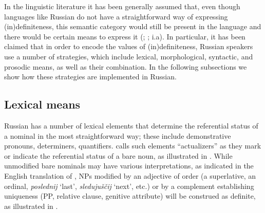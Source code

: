 \documentclass[output=paper,
colorlinks,
citecolor=brown,
newtxmath
]{langscibook}
\begin{document}
In the linguistic literature it has been generally assumed that, even though languages like Russian do not have a straightforward way of expressing (in)defi\-nite\-ness, this semantic category would still be present in the language and there would be certain means to express it (\citealt{GalkinaFedoruk1963}; \citealt{Pospelov1970}; i.a). %
In particular, it has been claimed
that in order to encode the values of (in)defi\-nite\-ness, Russian speakers use a number of strategies, which include lexical, %
morphological, syntactic, and prosodic means, as well as %
their combination. In the following subsections we show how these strategies are implemented in Russian.

\subsection{Lexical means}
Russian has a number of lexical elements that determine the referential status of a nominal in the most straightforward way; these include demonstrative pronouns, determiners, quantifiers. \citet{Paduceva1985} calls such elements ``actualizers'' as they mark or indicate the referential status of a bare noun, as illustrated in . While unmodified bare nominals may have various interpretations, as indicated in the English translation of
, NPs modified by an adjective of order (a superlative, an ordinal, \textit{poslednij} `last', \textit{sledujuščij}  `next', etc.) %
or by a complement establishing uniqueness (PP, relative clause, genitive attribute) %
will be construed as definite, as illustrated in .

\end{document}
